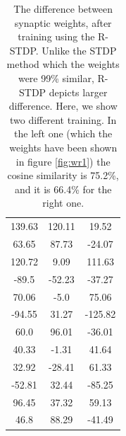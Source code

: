 \documentclass{article}
\begin{document}
\begin{table}
\begin{tabular}{|c|c|c|}
			139.63 & 120.11 & 19.52\\
			63.65 & 87.73 & -24.07\\
			120.72 & 9.09 & 111.63\\
			-89.5 & -52.23 & -37.27\\
			70.06 & -5.0 & 75.06\\
			-94.55 & 31.27 & -125.82\\
			60.0 & 96.01 & -36.01\\
			40.33 & -1.31 & 41.64\\
			32.92 & -28.41 & 61.33\\
			-52.81 & 32.44 & -85.25\\
			96.45 & 37.32 & 59.13\\
			46.8 & 88.29 & -41.49\\
			\hline
		\end{tabular}
		\caption{The difference between synaptic weights, after training using the R-STDP. Unlike the STDP method which the weights were 99\% similar, R-STDP depicts larger difference. Here, we show two different training. In the left one (which the weights have been shown in figure \ref{fig:wr1}) the cosine similarity is 75.2\%, and it is 66.4\% for the right one.}
		\label{table:wr}
	\end{table}
	
\end{document}
